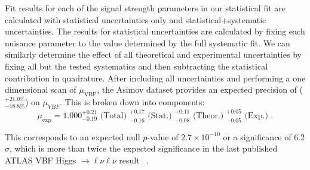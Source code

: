 Fit results for each of the signal strength parameters in our statistical fit are calculated with statistical uncertainties only and statistical$+$systematic uncertainties. The results for statistical uncertainties are calculated by fixing each nuisance parameter to the value determined by the full systematic fit. We can similarly determine the effect of all theoretical and experimental uncertainties by fixing all but the tested systematics and then subtracting the statistical contribution in quadrature. After including all uncertainties and performing a one dimensional scan of $\mu_\text{VBF}$, the Asimov dataset provides an expected precision of ($^{+21.0\%}_{-18.8\%}$) on $\mu_{VBF}$. This is broken down into components:
\begin{equation}
\mu_{\text{exp}} = 1.000 ^{+0.21}_{-0.19} \text{ (Total) } ^{+0.17}_{-0.16} \text{ (Stat.) } ^{+0.11}_{-0.08} \text{ (Theor.) } ^{+0.05}_{-0.05} \text{ (Exp.) }.
\end{equation}

This corresponds to an expected null $p$-value of $2.7\times10^{-10}$ or a significance of 6.2$\sigma$, which is more than twice the expected significance in the last published ATLAS VBF Higgs $\rightarrow \ell\nu\ell\nu$ result ~\cite{Aaboud_2019}.   


